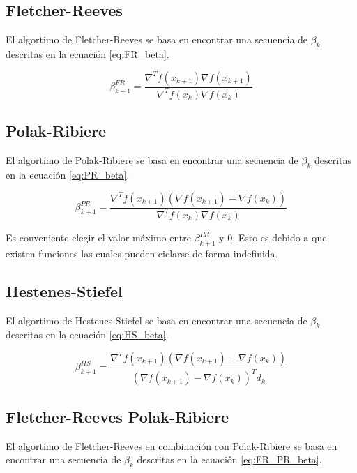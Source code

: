 \subsection{Fletcher-Reeves}

El algortimo de Fletcher-Reeves\cite{fletcher_1964} se basa en encontrar una secuencia de $\beta_k$ descritas en la ecuación \ref{eq:FR_beta}.

\begin{equation}
    \beta_{k+1}^{FR} = \frac{\nabla^T f(x_{k+1})\nabla f(x_{k+1})}{\nabla^T f(x_{k})\nabla f(x_{k})} \label{eq:FR_beta}
\end{equation}

\subsection{Polak-Ribiere}

El algortimo de Polak-Ribiere\cite{polak_1969} se basa en encontrar una secuencia de $\beta_k$ descritas en la ecuación \ref{eq:PR_beta}.

\begin{equation}
    \beta_{k+1}^{PR} = \frac{\nabla^T f(x_{k+1})(\nabla f(x_{k+1})-\nabla f(x_{k}))}{\nabla^T f(x_{k})\nabla f(x_{k})} \label{eq:PR_beta}
\end{equation}

Es conveniente elegir el valor máximo entre $\beta_{k+1}^{PR}$ y 0. Esto es debido a que existen funciones las cuales pueden ciclarse de forma indefinida.

\subsection{Hestenes-Stiefel}

El algortimo de Hestenes-Stiefel\cite{hestenes_1978} se basa en encontrar una secuencia de $\beta_k$ descritas en la ecuación \ref{eq:HS_beta}.

\begin{equation}
    \beta_{k+1}^{HS} = \frac{\nabla^T f(x_{k+1})(\nabla f(x_{k+1})-\nabla f(x_{k}))}{(\nabla f(x_{k+1})-\nabla f(x_{k}))^Td_{k}} \label{eq:HS_beta}
\end{equation}


\subsection{Fletcher-Reeves Polak-Ribiere}

El algortimo de Fletcher-Reeves en combinación con Polak-Ribiere\cite{Babaie_2014} se basa en encontrar una secuencia de $\beta_k$ descritas en la ecuación \ref{eq:FR_PR_beta}.

